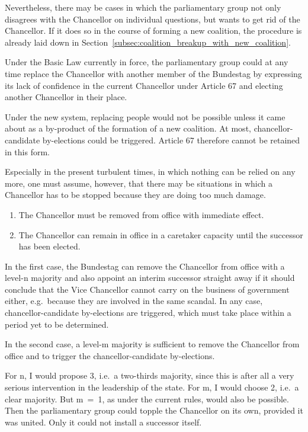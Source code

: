 Nevertheless, there may be cases in which the parliamentary group not only disagrees with the Chancellor on individual questions, but wants to get rid of the Chancellor.
If it does so in the course of forming a new coalition, the procedure is already laid down in Section~\ref{subsec:coalition_breakup_with_new_coalition}.

Under the Basic Law currently in force, the parliamentary group could at any time replace the Chancellor with another member of the Bundestag by expressing its lack of confidence in the current Chancellor under Article 67 and electing another Chancellor in their place.

Under the new system, replacing people would not be possible unless it came about as a by-product of the formation of a new coalition.
At most, chancellor-candidate by-elections could be triggered.
Article 67 therefore cannot be retained in this form.

Especially in the present turbulent times, in which nothing can be relied on any more, one must assume, however, that there may be situations in which a Chancellor has to be stopped because they are doing too much damage.

\begin{enumerate}
    \item The Chancellor must be removed from office with immediate effect.
    \item The Chancellor can remain in office in a caretaker capacity until the successor has been elected.
\end{enumerate}

In the first case, the Bundestag can remove the Chancellor from office with a level-n majority and also appoint an interim successor straight away if it should conclude that the Vice Chancellor cannot carry on the business of government either, e.g.\ because they are involved in the same scandal.
In any case, chancellor-candidate by-elections are triggered, which must take place within a period yet to be determined.

In the second case, a level-m majority is sufficient to remove the Chancellor from office and to trigger the chancellor-candidate by-elections.

For n, I would propose 3, i.e.\ a two-thirds majority, since this is after all a very serious intervention in the leadership of the state.
For m, I would choose 2, i.e.\ a clear majority.
But m~=~1, as under the current rules, would also be possible.
Then the parliamentary group could topple the Chancellor on its own, provided it was united.
Only it could not install a successor itself.

